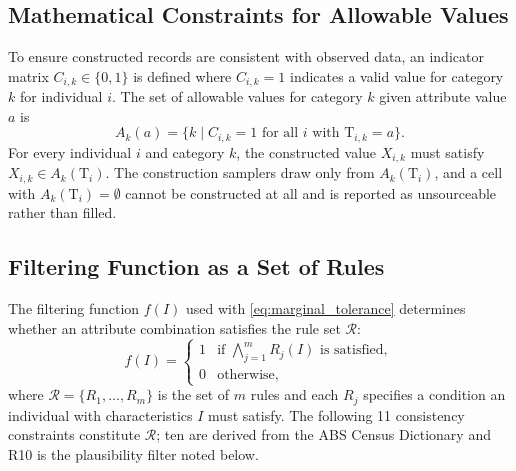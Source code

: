 \documentclass[review]{elsarticle}
\begin{document}


\subsection{Mathematical Constraints for Allowable Values}
\label{sec:mathconstraints}
To ensure constructed records are consistent with observed data, an indicator matrix \( C_{i,k}\in\{0,1\} \) is defined where \( C_{i,k}=1 \) indicates a valid value for category \( k \) for individual \( i \). The set of allowable values for category \( k \) given attribute value \( a \) is
\[
A_k(a) = \{ k \mid C_{i,k}=1 \text{ for all } i \text{ with } \text{T}_{i,k}=a \}.
\]
For every individual \( i \) and category \( k \), the constructed value \( X_{i,k} \) must satisfy \( X_{i,k}\in A_k(\text{T}_i) \). The construction samplers draw only from \( A_k(\text{T}_i) \), and a cell with \( A_k(\text{T}_i)=\emptyset \) cannot be constructed at all and is reported as unsourceable rather than filled.

\subsection{Filtering Function as a Set of Rules}
\label{sec:ref}
The filtering function $f(I)$ used with \cref{eq:marginal_tolerance} determines whether an attribute combination satisfies the rule set $\mathcal{R}$:
\[
f(I) = \begin{cases} 1 & \text{if } \bigwedge_{j=1}^{m} R_j(I) \text{ is satisfied}, \\ 0 & \text{otherwise}, \end{cases}
\]
where $\mathcal{R}=\{R_1,\dots,R_m\}$ is the set of $m$ rules and each $R_j$ specifies a condition an individual with characteristics $I$ must satisfy. The following 11 consistency constraints constitute $\mathcal{R}$; ten are derived from the ABS Census Dictionary and R10 is the plausibility filter noted below.
\end{document}
